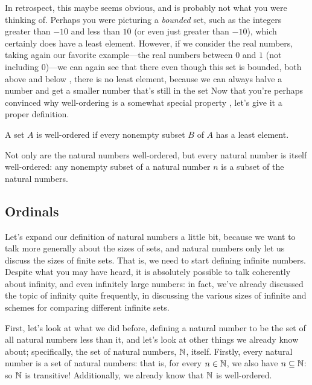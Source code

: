 In retrospect, this maybe seems obvious, and is probably not what you were thinking of.
Perhaps you were picturing a \emph{bounded} set, such as the integers greater than $-10$ and less than $10$ (or even just greater than $-10$), which certainly does have a least element.
However, if we consider the real numbers, taking again our favorite example---the real numbers between $0$ and $1$ (not including $0$)---we can again see that there even though this set is bounded, both above and below , there is no least element, because we can always halve a number and get a smaller number that's still in the set 
Now that you're perhaps convinced why well-ordering is a somewhat special property , let's give it a proper definition.

\begin{definition}
    A set $A$ is well-ordered if every nonempty subset $B$ of $A$ has a least element.
\end{definition}

Not only are the natural numbers well-ordered, but every natural number is itself well-ordered: any nonempty subset of a natural number $n$ is a subset of the natural numbers.


\subsection{Ordinals}

Let's expand our definition of natural numbers a little bit, because we want to talk more generally about the sizes of sets, and natural numbers only let us discuss the sizes of finite sets.
That is, we need to start defining infinite numbers.
Despite what you may have heard, it is absolutely possible to talk coherently about infinity, and even infinitely large numbers: in fact, we've already discussed the topic of infinity quite frequently, in discussing the various sizes of infinite and schemes for comparing different infinite sets.

First, let's look at what we did before, defining a natural number to be the set of all natural numbers less than it, and let's look at other things we already know about; specifically, the set of natural numbers, $\mathbb{N}$, itself.
Firstly, every natural number is a set of natural numbers: that is, for every $n \in \mathbb{N}$, we also have $n \subseteq \mathbb{N}$: so $\mathbb{N}$ is transitive!
Additionally, we already know that $\mathbb{N}$ is well-ordered. 

